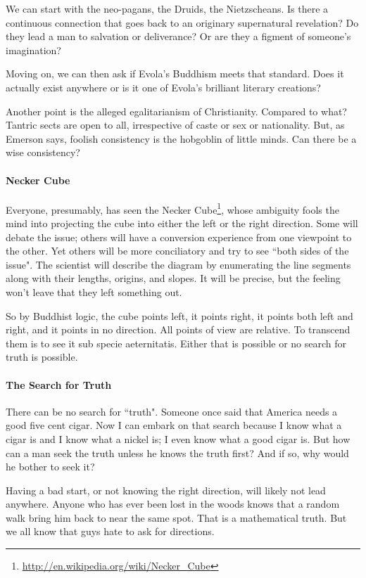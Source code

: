 We can start with the neo-pagans, the Druids, the Nietzscheans. Is there a continuous connection that goes back to an originary supernatural revelation? Do they lead a man to salvation or deliverance? Or are they a figment of someone's imagination?

Moving on, we can then ask if Evola's Buddhism meets that standard. Does it actually exist anywhere or is it one of Evola's brilliant literary creations?

Another point is the alleged egalitarianism of Christianity. Compared to what? Tantric sects are open to all, irrespective of caste or sex or nationality. But, as Emerson says, foolish consistency is the hobgoblin of little minds. Can there be a wise consistency?

\paragraph{Necker Cube}
Everyone, presumably, has seen the Necker Cube\footnote{\url{http://en.wikipedia.org/wiki/Necker_Cube}}, whose ambiguity fools the mind into projecting the cube into either the left or the right direction. Some will debate the issue; others will have a conversion experience from one viewpoint to the other. Yet others will be more conciliatory and try to see ``both sides of the issue". The scientist will describe the diagram by enumerating the line segments along with their lengths, origins, and slopes. It will be precise, but the feeling won't leave that they left something out.

So by Buddhist logic, the cube points left, it points right, it points both left and right, and it points in no direction. All points of view are relative. To transcend them is to see it sub specie aeternitatis. Either that is possible or no search for truth is possible.

\paragraph{The Search for Truth}
There can be no search for ``truth". Someone once said that America needs a good five cent cigar. Now I can embark on that search because I know what a cigar is and I know what a nickel is; I even know what a good cigar is. But how can a man seek the truth unless he knows the truth first? And if so, why would he bother to seek it?

Having a bad start, or not knowing the right direction, will likely not lead anywhere. Anyone who has ever been lost in the woods knows that a random walk bring him back to near the same spot. That is a mathematical truth. But we all know that guys hate to ask for directions.

